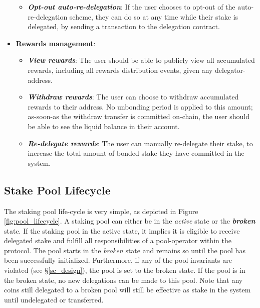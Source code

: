 \begin{itemize}
\begin{itemize}
        \item \textit{\textbf{Opt-out auto-re-delegation}}: If the user chooses to opt-out of the auto-re-delegation scheme, they can do so at any time while their stake is delegated, by sending a transaction to the delegation contract.  
    \end{itemize}
    \item \textbf{Rewards management}: 
    \begin{itemize}
        \item \textit{\textbf{View rewards}}: The user should be able to publicly view all accumulated rewards, including all rewards distribution events, given any delegator-address.  
        \item \textit{\textbf{Withdraw rewards}}: The user can choose to withdraw accumulated rewards to their address. No unbonding period is applied to this amount; as-soon-as the withdraw transfer is committed on-chain, the user should be able to see the liquid balance in their account. 
        \item \textit{\textbf{Re-delegate rewards}}: The user can manually re-delegate their stake, to increase the total amount of bonded stake they have committed in the system.   
    \end{itemize}
\end{itemize}

\subsection{Stake Pool Lifecycle} \label{pool_lifecycle}

The staking pool life-cycle is very simple, as depicted in Figure \ref{fig:pool_lifecycle}. A staking pool can either be in the \textit{active} state or the \textbf{\textit{broken}} state. If the staking pool in the active state, it implies it is eligible to receive delegated stake and fulfill all responsibilities of a pool-operator within the protocol. The pool starts in the \textit{broken} state and remains so until the pool has been successfully initialized. Furthermore, if any of the pool invariants are violated (see \S\ref{sc_design}), the pool is set to the broken state. If the pool is in the broken state, no new delegations can be made to this pool. Note that any coins still delegated to a broken pool will still be effective as stake in the system until undelegated or transferred.  

